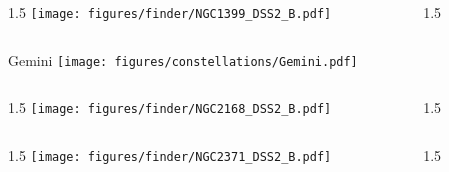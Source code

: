 \documentclass[final]{beamer}
\newlength{\colwidth}
\begin{document}

\begin{frame}[t]{}
  \begin{columns}[T]
    \begin{column}{1.5\colwidth}
      \centering
      \texttt{[image: figures/finder/NGC1399\_DSS2\_B.pdf]}
    \end{column}
    \begin{column}{1.5\colwidth}
      \Large
      
    \end{column}
  \end{columns}
  \vspace{\fill}
\end{frame}


\begin{frame}[t]{\LARGE Gemini}
  \centering
  \texttt{[image: figures/constellations/Gemini.pdf]}
\end{frame}


\begin{frame}[t]{}
  \begin{columns}[T]
    \begin{column}{1.5\colwidth}
      \centering
      \texttt{[image: figures/finder/NGC2168\_DSS2\_B.pdf]}
    \end{column}
    \begin{column}{1.5\colwidth}
      \Large
      
    \end{column}
  \end{columns}
  \vspace{\fill}
  \begin{columns}[T]
    \begin{column}{1.5\colwidth}
      \centering
      \texttt{[image: figures/finder/NGC2371\_DSS2\_B.pdf]}
    \end{column}
    \begin{column}{1.5\colwidth}
      \Large
      
    \end{column}
  \end{columns}
\end{frame}
\end{document}
